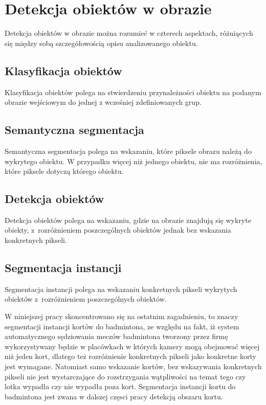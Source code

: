 \section{Detekcja obiektów w obrazie}
\label{sec:typy_detekcji}

Detekcja obiektów w obrazie można rozumieć w czterech aspektach, różniących się między sobą szczegółowością opisu analizowanego obiektu. 

\subsection*{Klasyfikacja obiektów}
Klasyfikacja obiektów polega na stwierdzeniu przynależności obiektu na podanym obrazie wejściowym do jednej z wcześniej zdefiniowanych grup.
\subsection*{Semantyczna segmentacja}
Semantyczna segmentacja polega na wskazaniu, które piksele obrazu należą do wykrytego obiektu. W przypadku więcej niż jednego obiektu, nie ma rozróżnienia, które piksele dotyczą którego obiektu.
\subsection*{Detekcja obiektów}
Detekcja obiektów polega na wskazaniu, gdzie na obrazie znajdują się wykryte obiekty, z~rozróżnieniem poszczególnych obiektów jednak bez wskazania konkretnych pikseli.
\subsection*{Segmentacja instancji}
Segmentacja instancji polega na wskazaniu konkretnych pikseli wykrytych obiektów z~rozróżnieniem poszczególnych obiektów.



W niniejszej pracy skoncentrowano się na ostatnim zagadnieniu,  to znaczy segmentacji instancji kortów do badmintona, ze względu na fakt, iż system automatycznego sędziowania meczów badmintona tworzony przez firmę \blue{} wykorzystywany będzie w placówkach w których kamery mogą obejmować więcej niż jeden kort, dlatego też rozróżnienie konkretnych pikseli jako konkretne korty jest wymagane. Natomiast samo wskazanie kortów, bez wskazywania konkretnych pikseli nie jest wystarczające do rozstrzygania wątpliwości na temat tego czy lotka wypadła czy nie wypadła poza kort. Segmentacja instancji kortu do badmintona jest zwana w dalszej częsci pracy detekcją obszaru kortu.
